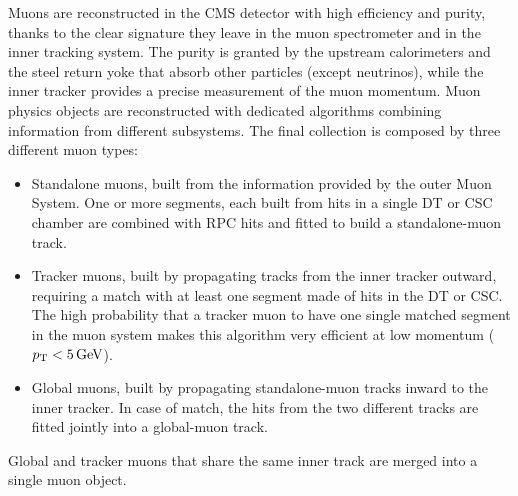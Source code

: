 Muons are reconstructed in the CMS detector with high efficiency and purity,
thanks to the clear signature they leave in the muon spectrometer and in the inner tracking system.
The purity is granted by the upstream calorimeters and the steel return yoke that absorb other particles (except neutrinos),
while the inner tracker provides a precise measurement of the muon momentum.
Muon physics objects are reconstructed with dedicated algorithms combining information from different subsystems.
The final collection is composed by three different muon types:

\begin{itemize}
\item Standalone muons, built from the information provided by the outer Muon System.
      One or more segments, each built from hits in a single DT or CSC chamber are combined
      with RPC hits and fitted to build a standalone-muon track.
\item Tracker muons, built by propagating tracks from the inner tracker outward,
      requiring a match with at least one segment made of hits in the DT or CSC.
      The high probability that a tracker muon to have one single matched segment in the muon system
      makes this algorithm very efficient at low momentum ($p_{\mathrm{T}} < 5 \,\text{Ge\hspace{-.08em}V}$).
\item Global muons, built by propagating standalone-muon tracks inward to the inner tracker.
      In case of match, the hits from the two different tracks are fitted jointly into a global-muon track.
\end{itemize}

Global and tracker muons that share the same inner track are merged into a single muon object.


